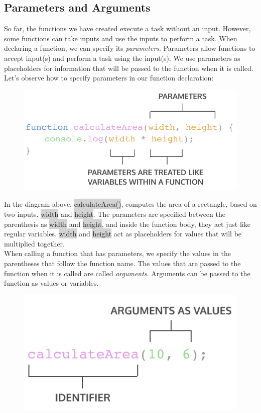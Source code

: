 \documentclass[11pt]{article}
\begin{document}
\subsection{Parameters and Arguments}
So far, the functions we have created execute a task without an input. However, some functions can take inputs and use the inputs to perform a task. When declaring a function, we can specify its \textit{parameters}. Parameters allow functions to accept input(s) and perform a task using the input(s). We use parameters as placeholders for information that will be passed to the function when it is called. \\
\newline
Let’s observe how to specify parameters in our function declaration:
\begin{figure}[H]
\includegraphics[scale = 0.75]{4_4}
\centering
\end{figure}
In the diagram above, \colorbox{lightgray}{calculateArea()}, computes the area of a rectangle, based on two inputs, \colorbox{lightgray}{width} and \colorbox{lightgray}{height}. The parameters are specified between the parenthesis as \colorbox{lightgray}{width} and \colorbox{lightgray}{height}, and inside the function body, they act just like regular variables. \colorbox{lightgray}{width} and \colorbox{lightgray}{height} act as placeholders for values that will be multiplied together. \\
\newline
When calling a function that has parameters, we specify the values in the parentheses that follow the function name. The values that are passed to the function when it is called are called \textit{arguments}. Arguments can be passed to the function as values or variables.
\begin{figure}[H]
\includegraphics[scale = 0.65]{4_5}
\centering
\end{figure}
\end{document}
